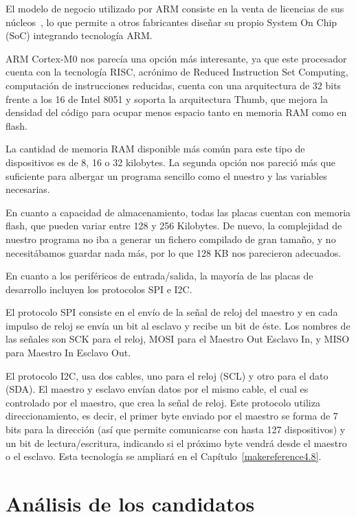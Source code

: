 El modelo de negocio utilizado por ARM consiste en la venta de licencias de sus núcleos~\cite{ARMIPCore}, lo que permite a otros fabricantes diseñar su propio System On Chip (SoC) integrando tecnología ARM.

ARM Cortex-M0 nos parecía una opción más interesante, ya que este procesador cuenta con la tecnología RISC, acrónimo de Reduced Instruction Set Computing, computación de instrucciones reducidas, cuenta con una arquitectura de 32 bits frente a los 16 de Intel 8051 y soporta la arquitectura Thumb, que mejora la densidad del código para ocupar menos espacio tanto en memoria RAM como en flash.

La cantidad de memoria RAM disponible más común para este tipo de dispositivos es de 8, 16 o 32 kilobytes. La segunda opción nos pareció más que suficiente para albergar un programa sencillo como el nuestro y las variables necesarias.

En cuanto a capacidad de almacenamiento, todas las placas cuentan con memoria flash, que pueden variar entre 128 y 256 Kilobytes. De nuevo, la complejidad de nuestro programa no iba a generar un fichero compilado de gran tamaño, y no necesitábamos guardar nada más, por lo que 128 KB nos parecieron adecuados.

En cuanto a los periféricos de entrada/salida, la mayoría de las placas de desarrollo incluyen los protocolos SPI e I2C.

El protocolo SPI consiste en el envío de la señal de reloj del maestro y en cada impulso de reloj se envía un bit al esclavo y recibe un bit de éste. Los nombres de las señales son SCK para el reloj, MOSI para el Maestro Out Esclavo In, y MISO para Maestro In Esclavo Out.

El protocolo I2C, usa dos cables, uno para el reloj (SCL) y otro para el dato (SDA). El maestro y esclavo envían datos por el mismo cable, el cual es controlado por el maestro, que crea la señal de reloj. Este protocolo utiliza direccionamiento, es decir, el primer byte enviado por el maestro se forma de 7 bits para la dirección (así que permite comunicarse con hasta 127 dispositivos) y un bit de lectura/escritura, indicando si el próximo byte vendrá desde el maestro o el esclavo. Esta tecnología se ampliará en el Capítulo~\ref{makereference4.8}.

\section{Análisis de los candidatos}
\label{makereference3.3}

